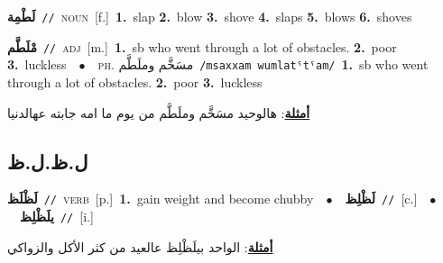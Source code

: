\documentclass[10pt,a4paper,twoside]{article} %
\begin{document}
\begin{multicols}{2}
{\setlength\topsep{0pt}\textbf{\foreignlanguage{arabic}{لَطْمِة}}\ {\color{gray}\texttt{//}\color{black}}\ \textsc{noun}\ [f.]\ \textbf{1.}~slap  \textbf{2.}~blow  \textbf{3.}~shove  \textbf{4.}~slaps  \textbf{5.}~blows  \textbf{6.}~shoves\ } \vspace{2mm}

{\setlength\topsep{0pt}\textbf{\foreignlanguage{arabic}{مْلَطَّم}}\ {\color{gray}\texttt{//}\color{black}}\ \textsc{adj}\ [m.]\ \textbf{1.}~sb who went through a lot of obstacles.  \textbf{2.}~poor  \textbf{3.}~luckless\ \ $\bullet$\ \ \textsc{ph.} \color{gray} \foreignlanguage{arabic}{مسَخَّم وملَطَّم}\color{black}\ {\color{gray}\texttt{/{\sffamily msaxxam wumlatˤtˤam}/}\color{black}}\ \textbf{1.}~sb who went through a lot of obstacles.  \textbf{2.}~poor  \textbf{3.}~luckless\  \begin{flushright}\color{gray}\foreignlanguage{arabic}{\textbf{\underline{\foreignlanguage{arabic}{أمثلة}}}: هالوحيد مسَخَّم وملَطَّم من يوم ما امه جابته عهالدنيا}\end{flushright}\color{black}} \vspace{2mm}

\vspace{-3mm}
\subsection*{\color{blue}\foreignlanguage{arabic}{ل.ظ.ل.ظ}\color{blue}{}} 

{\setlength\topsep{0pt}\textbf{\foreignlanguage{arabic}{لَظْلَظ}}\ {\color{gray}\texttt{//}\color{black}}\ \textsc{verb}\ [p.]\ \textbf{1.}~gain weight and become chubby\ \ $\bullet$\ \ \setlength\topsep{0pt}\textbf{\foreignlanguage{arabic}{لَظْلِظ}}\ {\color{gray}\texttt{//}\color{black}}\ [c.]\ \ $\bullet$\ \ \setlength\topsep{0pt}\textbf{\foreignlanguage{arabic}{يلَظْلِظ}}\ {\color{gray}\texttt{//}\color{black}}\ [i.]\  \begin{flushright}\color{gray}\foreignlanguage{arabic}{\textbf{\underline{\foreignlanguage{arabic}{أمثلة}}}: الواحد بيلَظْلِظ عالعيد من كثر الأكل والزواكي}\end{flushright}\color{black}} \vspace{2mm}


\end{multicols}
\end{document}
